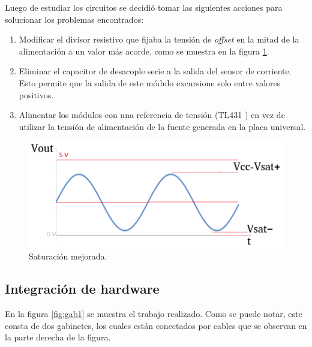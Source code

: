 Luego de estudiar los circuitos se decidió tomar las siguientes acciones para solucionar los problemas encontrados:
\begin{enumerate}
\item Modificar el divisor resistivo que fijaba la tensión de \textit{offset} en la mitad de la alimentación a un valor más acorde, como se muestra en la figura  \ref{fig:sensSatMej}.
\item Eliminar el capacitor de desacople serie a la salida del sensor de corriente. Esto permite que la salida de este módulo excursione solo entre valores positivos.
\item Alimentar los módulos con una referencia de tensión (TL431 \citep{TL431}) en vez de utilizar la tensión de alimentación de la fuente generada en la placa universal.
\end{enumerate}

\begin{figure}[htpb]
	\centering
	\includegraphics[scale=1]{./Figures/ZMPT101B_waves_sat_mod.png}
	\caption{Saturación mejorada.}
	\label{fig:sensSatMej}
\end{figure}


\subsection{Integración de hardware}

En la figura \ref{fig:gab1} se muestra el trabajo realizado. Como se puede notar, este consta de dos gabinetes, los cuales están conectados por cables que se  observan en la parte derecha de la figura. 

